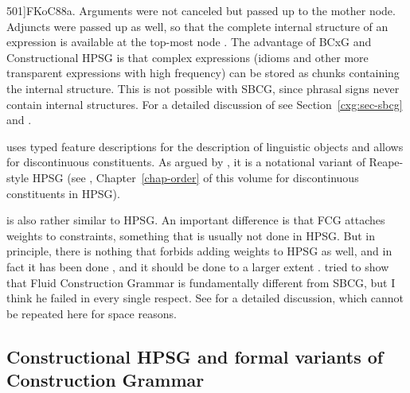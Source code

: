 \documentclass[output=paper
	        ,collection
	        ,collectionchapter
 	        ,biblatex
                ,babelshorthands
                ,newtxmath
                ,draftmode
                ,colorlinks, citecolor=brown
]{langscibook}
\begin{document}
  501]{FKoC88a}. Arguments were not canceled but
passed up to the mother node. Adjuncts were passed up as well, so that the complete internal
structure of an expression is available at the top-most node \citep[]{KF99a}. The advantage of BCxG and
Constructional HPSG \citep{Sag97a} is that complex expressions (\eg idioms and other more transparent expressions
with high frequency) can be stored as chunks containing the internal structure. This is not possible
with SBCG, since phrasal signs never contain internal structures. For a detailed discussion of \sbcg
see Section~\ref{cxg:sec-sbcg} and .

 \citep{BC2005a} uses typed feature descriptions for the description of
linguistic objects and allows for discontinuous constituents. As
argued by \citet[Section~10.6.3]{MuellerGT-Eng1}, it is a notational variant of Reape-style HPSG
\citep{Reape94a} (see \citealt[Section~\ref{sec-domains}]{chapters/order}, Chapter~\ref{chap-order}
of this volume for discontinuous constituents in HPSG).

 is also rather similar to HPSG. An important difference is that FCG attaches
weights to constraints, something that is usually not done in HPSG. But in principle, there is
nothing that forbids adding weights to HPSG as well, and in fact it has been done \citep{Brew95a,BC99a,MT2008a-u}, and it should be
done to a larger extent \citep{Miller2013a}.  tried to show that
Fluid Construction Grammar is fundamentally different from SBCG, but I think he failed in every
single respect. See  for a detailed discussion, which cannot be repeated here for
space reasons.




\subsection{Constructional HPSG and formal variants of Construction Grammar}
\end{document}

